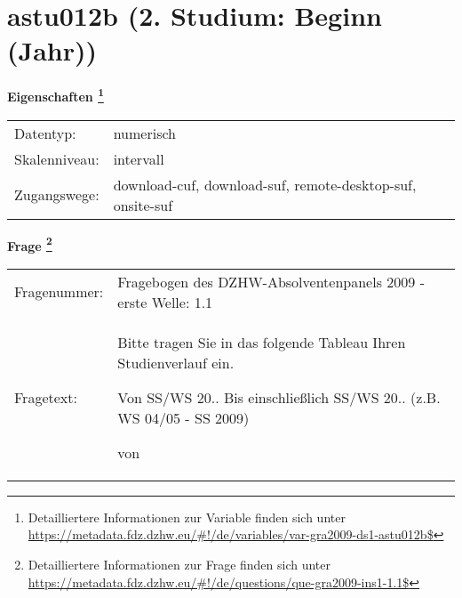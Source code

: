 
    \setcounter{footnote}{0}

    \vspace*{-1.8cm}
	\section{astu012b (2. Studium: Beginn (Jahr))}
	\label{section:astu012b}



    \vspace*{0.5cm}
    \noindent\textbf{Eigenschaften
	\footnote{Detailliertere Informationen zur Variable finden sich unter
		\url{https://metadata.fdz.dzhw.eu/\#!/de/variables/var-gra2009-ds1-astu012b$}}}\\
	\begin{tabularx}{\hsize}{@{}lX}
	Datentyp: & numerisch \\
	Skalenniveau: & intervall \\
	Zugangswege: &
	  download-cuf, 
	  download-suf, 
	  remote-desktop-suf, 
	  onsite-suf
 \\
    \end{tabularx}



				\vspace*{0.5cm}
                \noindent\textbf{Frage
	                \footnote{Detailliertere Informationen zur Frage finden sich unter
		              \url{https://metadata.fdz.dzhw.eu/\#!/de/questions/que-gra2009-ins1-1.1$}}}\\
				\begin{tabularx}{\hsize}{@{}lX}
					Fragenummer: &
					  Fragebogen des DZHW-Absolventenpanels 2009 - erste Welle:
					  1.1
 \\
					Fragetext: & Bitte tragen Sie in das folgende Tableau Ihren Studienverlauf ein.\par  Von SS/WS 20.. Bis einschließlich SS/WS 20.. (z.B. WS 04/05 - SS 2009)\par  von \\
				\end{tabularx}





